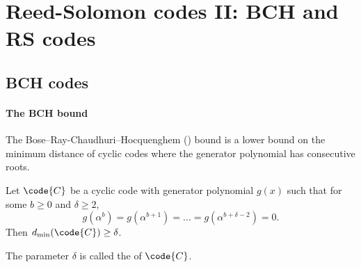 \documentclass[a4paper, 11pt, openany]{book}
\begin{document}
\section{Reed-Solomon codes II: BCH and RS codes}
\label{sec:27}



\subsection{BCH codes}

\paragraph{The BCH bound}
The Bose--Ray-Chaudhuri--Hocquenghem () bound is a lower bound on the minimum distance of cyclic codes where the generator polynomial has consecutive roots.

\begin{theorem} Let $\code{C}$ be a cyclic code with generator polynomial $g(x)$ such that for some $b \ge 0$ and $\delta \ge 2$,
$$
	g(\alpha^b) = g(\alpha^{b+1}) = \dots = g(\alpha^{b + \delta - 2}) = 0.
$$
Then $d_{\min}(\code{C}) \ge \delta$.
\end{theorem}

The parameter $\delta$ is called the  of $\code{C}$.
\end{document}
